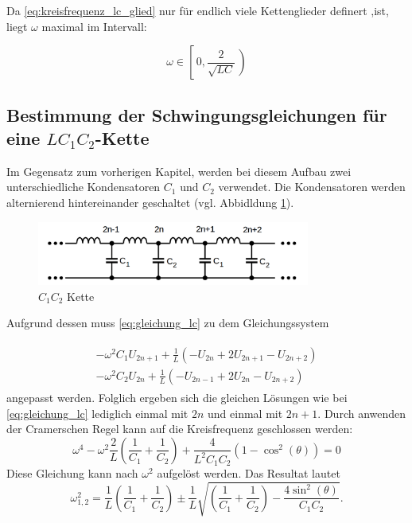 Da \eqref{eq:kreisfrequenz_lc_glied} nur für endlich viele Kettenglieder definert ,ist, liegt $\omega$ maximal im Intervall: %

\begin{equation}
\label{eq:menge_omega_lc_glied}
\omega\in\left[\,0,\frac{2}{\sqrt{LC}}\,\right)
\end{equation}

\subsection{Bestimmung der Schwingungsgleichungen für eine $LC_1C_2$-Kette}
Im Gegensatz zum vorherigen Kapitel, werden bei diesem Aufbau zwei unterschiedliche
Kondensatoren $C_1$ und $C_2$ verwendet. Die Kondensatoren werden
alternierend hintereinander geschaltet (vgl. Abbidldung \ref{fig:alternierende_kette}).

\begin{figure}
  \centering
  \includegraphics[width=0.8\textwidth]{bilder/alternierende_kette.png}
  \caption{$C_1C_2$ Kette}
  \label{fig:alternierende_kette}
\end{figure}


Aufgrund dessen muss \eqref{eq:gleichung_lc} zu dem Gleichungssystem

\begin{align}
\label{eq:lc1c2_gleichungsy}
\begin{aligned}
-\omega^2C_1U_{2n+1}+\frac{1}{L}\left(-U_{2n}+2U_{2n+1}-U_{2n+2}\right)\\
-\omega^2C_2U_{2n}+\frac{1}{L}\left(-U_{2n-1}+2U_{2n}-U_{2n+2}\right)
\end{aligned}
\end{align}
angepasst werden.
Folglich ergeben sich die gleichen Lösungen wie bei \eqref{eq:gleichung_lc}
lediglich einmal mit $2n$ und einmal mit $2n+1$.
Durch anwenden der Cramerschen Regel kann auf die Kreisfrequenz geschlossen werden: %
\begin{equation*}
\omega^4-\omega^2\frac{2}{L}\left(\frac{1}{C_1}+\frac{1}{C_2}\right)+\frac{4}{L^2C_1C_2}\left(1-\cos^2(\theta)\right)=0
\end{equation*}
Diese Gleichung kann nach $\omega^2$ aufgelöst werden.
Das Resultat lautet %
\begin{equation}
\label{eq:omega_ceins_czwei}
\omega_{1,2}^{2}=\frac{1}{L}\left(\frac{1}{C_1}+\frac{1}{C_2}\right)\pm\frac{1}{L}\sqrt{\left(\frac{1}{C_1}+\frac{1}{C_2}\right)-\frac{4\sin^2(\theta)}{C_1C_2}}.
\end{equation}


